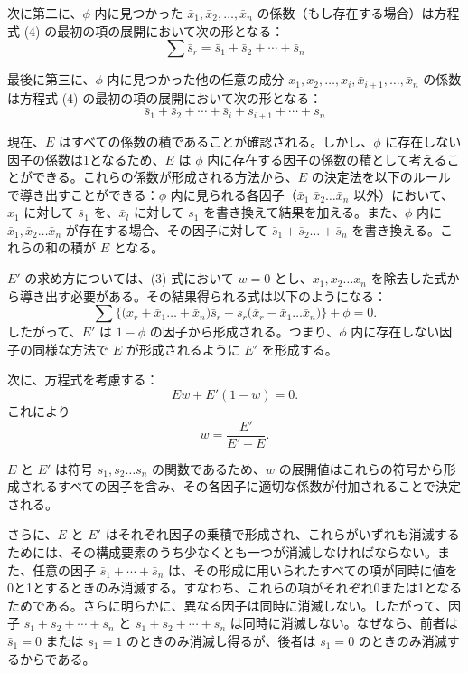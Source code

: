 \documentclass[a4paper,11pt,openany]{ltjsbook}
\begin{document}
次に第二に、$\phi$ 内に見つかった $\bar{x}_1, \bar{x}_2, \ldots, \bar{x}_n$ の係数（もし存在する場合）は方程式 (4) の最初の項の展開において次の形となる：
\[
  \sum \bar{s}_r = \bar{s}_1 + \bar{s}_2 + \cdots + \bar{s}_n
\]

最後に第三に、$\phi$ 内に見つかった他の任意の成分 $x_1, x_2, \ldots, x_i, \bar{x}_{i+1}, \ldots, \bar{x}_n$ の係数は方程式 (4) の最初の項の展開において次の形となる：
\[
  \bar{s}_1 + \bar{s}_2 + \cdots + \bar{s}_i + s_{i+1} + \cdots + s_n
\]

現在、$E$ はすべての係数の積であることが確認される。しかし、$\phi$ に存在しない因子の係数は1となるため、$E$ は $\phi$ 内に存在する因子の係数の積として考えることができる。これらの係数が形成される方法から、$E$ の決定法を以下のルールで導き出すことができる：$\phi$ 内に見られる各因子（$\bar{x}_1 \; \bar{x}_2 \dotsc \bar{x}_n$ 以外）において、$x_1$ に対して $\bar{s}_1$ を、$\bar{x}_l$ に対して $s_1$ を書き換えて結果を加える。また、$\phi$ 内に $\bar{x}_1, \bar{x}_2 \dotsc \bar{x}_n$ が存在する場合、その因子に対して $\bar{s}_1 + \bar{s}_2 \dotsc + \bar{s}_n$ を書き換える。これらの和の積が $E$ となる。

$E'$ の求め方については、(3) 式において $w = 0$ とし、$x_1, x_2 \dotsc x_n$ を除去した式から導き出す必要がある。その結果得られる式は以下のようになる：
\[
  \sum \bigl\{
    \bigl( x_r + \bar{x}_1 \dotsc + \bar{x}_n \bigr)\bar{s}_r
         + s_r\bigl(\bar{x}_r - \bar{x}_1 \dotsc \bar{x}_n \bigr)
  \bigr\} + \phi = 0.  \tag{5}
\]
したがって、$E'$ は $1 - \phi$ の因子から形成される。つまり、$\phi$ 内に存在しない因子の同様な方法で $E$ が形成されるように $E'$ を形成する。

次に、方程式を考慮する：
\[
  Ew + E'(1-w) = 0.
\]
これにより
\[
  w = \frac{E'}{E'-E}.   \tag{6}
\]

$E$ と $E'$ は符号 $s_1, s_2 \dotsc s_n$ の関数であるため、$w$ の展開値はこれらの符号から形成されるすべての因子を含み、その各因子に適切な係数が付加されることで決定される。

さらに、$E$ と $E'$ はそれぞれ因子の乗積で形成され、これらがいずれも消滅するためには、その構成要素のうち少なくとも一つが消滅しなければならない。また、任意の因子 $\bar{s}_1 + \cdots + \bar{s}_n$ は、その形成に用いられたすべての項が同時に値を0と1とするときのみ消滅する。すなわち、これらの項がそれぞれ0または1となるためである。さらに明らかに、異なる因子は同時に消滅しない。したがって、因子 $\bar{s}_1 + \bar{s}_2 + \cdots + \bar{s}_n$ と $s_1 + \bar{s}_2 + \cdots + \bar{s}_n$ は同時に消滅しない。なぜなら、前者は $\bar{s}_1 = 0$ または $s_1 = 1$ のときのみ消滅し得るが、後者は $s_1 = 0$ のときのみ消滅するからである。
\end{document}
